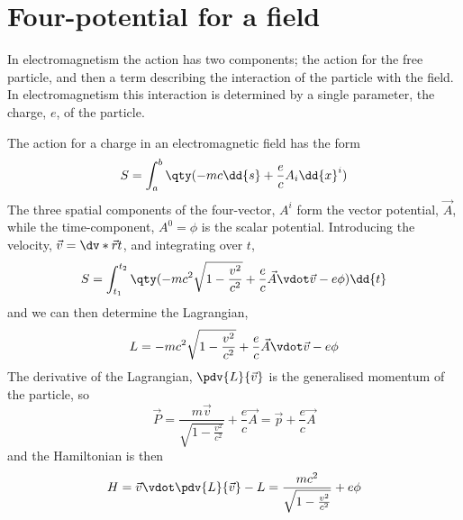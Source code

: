 
\section{Four-potential for a field}
\label{sec:four-potential-field}

In electromagnetism the action has two components; the action for the
free particle, and then a term describing the interaction of the
particle with the field. In electromagnetism this interaction is
determined by a single parameter, the charge, $e$, of the particle.

The action for a charge in an electromagnetic field has the form
\begin{equation}
  \label{eq:75}
  S = \int_a^b \qty( -mc \dd{s} + \frac{e}{c} A_i \dd{x}^i )
\end{equation}
The three spatial components of the four-vector, $A^i$ form the vector
potential, $\vec{A}$, while the time-component, $A^0 = \phi$ is the
scalar potential. Introducing the velocity, $\vec{v} =
\dv*{\vec{r}}{t}$, and integrating over $t$,
\begin{equation}
  \label{eq:76}
  S = \int_{t_1}^{t_2} \qty( - mc^2 \sqrt{1 - \frac{v^2}{c^2}} + \frac{e}{c} \vec{A} \vdot \vec{v} - e \phi ) \dd{t}
\end{equation}
and we can then determine the Lagrangian,
\begin{equation}
  \label{eq:77}
  L = - mc^2 \sqrt{1 - \frac{v^2}{c^2}} 
      + \frac{e}{c} \vec{A} \vdot \vec{v} 
      - e \phi
\end{equation}
The derivative of the Lagrangian, $\pdv{L}{\vec{v}}$ is the
generalised momentum of the particle, so
\begin{equation}
  \label{eq:78}
  \vec{P} = \frac{m \vec{v}}{\sqrt{1 - \frac{v^2}{c^2}}} + \frac{e}{c} \vec{A} = \vec{p} + \frac{e}{c} \vec{A}
\end{equation}
and the Hamiltonian is then
\begin{equation}
  \label{eq:79}
  H = \vec{v} \vdot \pdv{L}{\vec{v}} - L = \frac{mc^2}{\sqrt{1 - \frac{v^2}{c^2}}} + e \phi
\end{equation}


